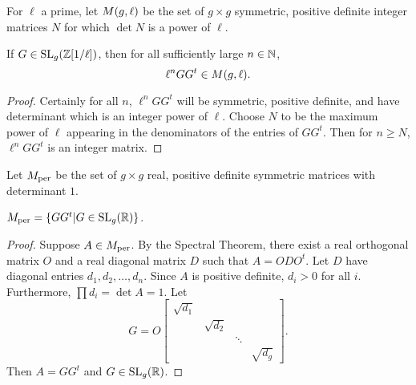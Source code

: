 \documentclass{amsart}
\begin{document}


\begin{definition}
  For $\ell$ a prime, let $M(g,\ell)$ be the set of $g \times g$ symmetric, positive definite integer matrices $N$ for which $\det N$ is a power of $\ell$.
\end{definition}

\begin{lemma}\label{lemma:ggt-spd-detl}
  If $G \in \operatorname{SL}_g(\mathbb{Z}[1/\ell])$, then for all sufficiently large $n \in \mathbb{N}$,
  \[
    \ell^n GG^t \in M(g,\ell).
  \]
\end{lemma}

\begin{proof}
  Certainly for all $n$, $\ell^n GG^t$ will be symmetric, positive definite, and have determinant which is an integer power of $\ell$. Choose $N$ to be the maximum power of $\ell$ appearing in the denominators of the entries of $GG^t$. Then for $n \geq N$, $\ell^n GG^t$ is an integer matrix.
\end{proof}


\begin{definition}
  Let $M_{\textrm{per}}$ be the set of $g \times g$ real, positive definite symmetric matrices  with determinant $1$.
\end{definition}

\begin{lemma}\label{lemma:ggt-periodmatrices}
  $M_{\textrm{per}} = \{GG^t | G \in \operatorname{SL}_g(\mathbb{R})\}$.
\end{lemma}

\begin{proof}
  Suppose $A \in M_{\textrm{per}}$. By the Spectral Theorem, there exist a real orthogonal matrix $O$ and a real diagonal matrix $D$ such that $A = ODO^t$. Let $D$ have diagonal entries $d_1, d_2, \dots, d_n$. Since $A$ is positive definite, $d_i > 0$ for all $i$. Furthermore, $\prod d_i = \det A = 1$. Let
  \[
    G = O
    \begin{bmatrix}
      \sqrt{d_1} & & & \\
      & \sqrt{d_2} & & \\
      & & \ddots & \\
      & & & \sqrt{d_{g}} 
    \end{bmatrix}.
\]
Then $A = GG^t$ and $G \in \operatorname{SL}_g(\mathbb{R})$.
\end{proof}
\end{document}
